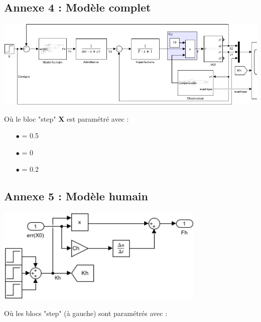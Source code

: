 \documentclass[a4paper,12pt]{article}
\begin{document}
    \subsection{Annexe 4 : Modèle complet} \label{Annexe:modelComplet}
    \begin{center}
        \includegraphics[width=16cm]{./img/model_complet.png}
    \end{center}
    Où le bloc "step" \textbf{X} est paramétré avec : 
    \begin{itemize}
        \item[$\bullet$]  = 0.5
        \item[$\bullet$]  = 0
        \item[$\bullet$]  = 0.2
    \end{itemize}


    \subsection{Annexe 5 : Modèle humain} \label{Annexe:modelHumain}
    \begin{center}
        \includegraphics[width=10cm]{./img/model_humain.png}
    \end{center}
    Où les blocs "step" (à gauche) sont paramétrés avec :
    
\end{document}
